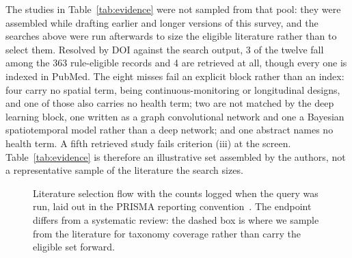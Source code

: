 \documentclass[journal]{IEEEtran}
\providecommand{\Description}[1]{}
\newif\ifsubmission
\begin{document}
The studies in Table~\ref{tab:evidence} were not sampled from that pool: they were assembled while drafting earlier and longer versions of this survey, and the searches above were run afterwards to size the eligible literature rather than to select them. Resolved by DOI against the search output, 3 of the twelve fall among the 363 rule-eligible records and 4 are retrieved at all, though every one is indexed in PubMed.\ifsubmission\else{} The eight misses fail an explicit block rather than an index: four carry no spatial term, being continuous-monitoring or longitudinal designs, and one of those also carries no health term; two are not matched by the deep learning block, one written as a graph convolutional network and one a Bayesian spatiotemporal model rather than a deep network; and one abstract names no health term. A fifth retrieved study fails criterion (iii) at the screen.\fi{} Table~\ref{tab:evidence} is therefore an illustrative set assembled by the authors, not a representative sample of the literature the search sizes.

\begin{figure}[t]
\centering
\footnotesize
{}
\caption{Literature selection flow with the counts logged when the query was run, laid out in the PRISMA reporting convention~\cite{page2021prisma}. The endpoint differs from a systematic review: the dashed box is where we sample from the literature for taxonomy coverage rather than carry the eligible set forward.}
\Description{A vertical flow diagram of the literature selection process, from sources and query through an unlogged screening stage, eligibility criteria, a quality and saturation gate, to the included studies.}
\label{fig:prisma}
\end{figure}
\end{document}
